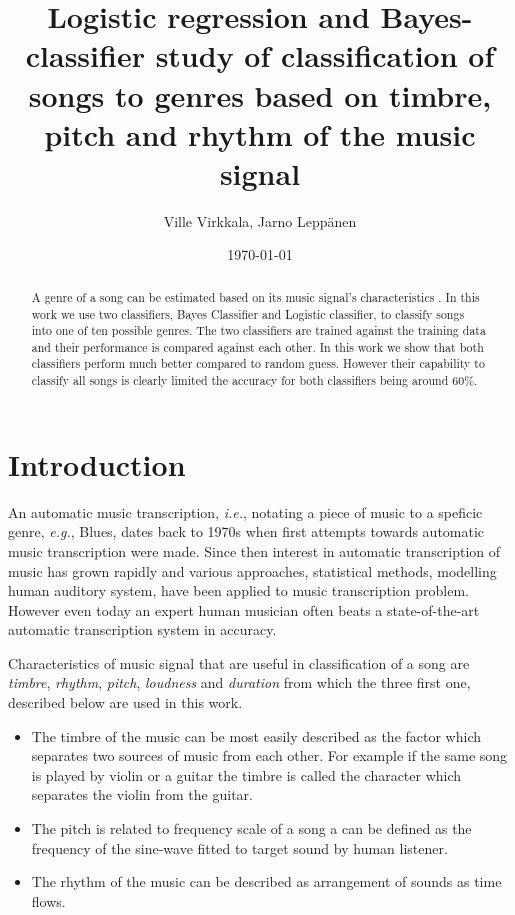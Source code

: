 \documentclass[aps,prb,10pt,twocolumn,groupedaddress]{revtex4-1}
\begin{document}
\title{Logistic regression and Bayes-classifier study of classification of
  songs to genres based on timbre, pitch and rhythm of the music signal }
\date{\today}
\author{Ville Virkkala, Jarno Leppänen}

\begin{abstract}
  A genre of a song can be estimated based on its music signal's
  characteristics . In this work we use two classifiers, Bayes Classifier
  and Logistic classifier, to classify songs into one of ten possible genres. The
  two classifiers are trained against the training data and their performance is
  compared against each other. In this work we show that both classifiers
  perform much better compared to random guess. However their capability to
  classify all songs is clearly limited the accuracy for both classifiers being
  around 60\%.
\end{abstract}

\maketitle

\section{Introduction}
An automatic music transcription, \textit{i.e.}, notating a piece of music to
a speficic genre, \textit{e.g.}, Blues, dates back to 1970s when first attempts
towards automatic music transcription were made\cite{musictranscription}. Since
then interest in
automatic transcription of music has grown rapidly and various approaches,
statistical methods, modelling human auditory system, have been applied to
music transcription problem. However even today an expert human musician often
beats a state-of-the-art automatic transcription system in accuracy.

Characteristics of music signal that are useful in classification of a song
are \textit{timbre}, \textit{rhythm}, \textit{pitch}, \textit{loudness} and
\textit{duration}\cite{musictranscription} from which the three first one,
described below are used in this work.
\begin{itemize}  
\item The timbre of the music can be most easily described as the factor
  which separates two sources of music from each other. For example if the same
  song is played by violin or a guitar the timbre is called the character which
  separates the violin from the guitar.
\item The pitch is related to frequency scale of a song a can be defined as the
  frequency of the sine-wave fitted to target sound by human listener.
\item The rhythm of the music can be described as arrangement of sounds as time
  flows.
\end{itemize}
\end{document}
